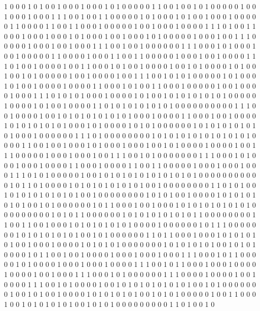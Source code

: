 1 0 0 0 1 0 1 0 0 1 0 0 0 1 0 0 0 1 0 1 0 0 0 0 0 1 1 0 0 1 0 0 1 0
1 0 0 0 0 0 1 0 0 1 0 0 0 1 0 0 0 1 1 1 0 0 1 0 0 1 1 0 0 0 0 0 1 0
1 0 0 0 1 0 1 0 0 1 0 0 0 1 0 0 0 0 0 1 1 0 0 0 0 1 1 0 0 1 1 0 0 0
1 0 0 0 0 0 1 0 0 1 0 0 0 1 0 0 0 0 1 1 1 0 1 0 0 1 1 0 0 0 1 0 0 0
1 0 0 0 1 0 1 0 0 0 1 0 0 1 0 0 0 1 0 1 0 0 0 0 0 1 0 0 0 1 0 0 1 1
1 0 0 0 0 0 1 0 0 0 1 0 0 1 0 0 0 1 1 1 0 0 1 0 0 1 0 0 0 0 0 0 1 1
1 0 0 0 1 0 1 0 0 0 1 0 0 1 0 0 0 0 0 1 1 0 0 0 0 1 0 0 0 1 1 0 0 1
1 0 0 0 0 0 1 0 0 0 1 0 0 1 0 0 0 0 1 1 1 0 1 0 0 1 0 0 0 0 1 0 0 1
1 0 0 0 1 0 1 0 0 1 0 0 0 0 1 0 0 1 0 1 0 0 0 0 1 0 1 0 0 1 0 0 1 0
1 0 0 0 0 0 1 0 0 1 0 0 0 0 1 0 0 1 1 1 0 0 1 0 1 0 1 0 0 0 0 0 1 0
1 0 0 0 1 0 1 0 0 1 0 0 0 0 1 0 0 0 0 1 1 0 0 0 1 0 1 0 0 1 1 0 0 0
1 0 0 0 0 0 1 0 0 1 0 0 0 0 1 0 0 0 1 1 1 0 1 0 1 0 1 0 0 0 1 0 0 0
0 1 0 1 0 0 1 0 1 0 1 0 1 0 1 0 1 0 0 0 0 0 1 0 0 0 0 1 0 1 0 0 1 0
0 0 0 1 1 0 1 0 1 0 1 0 1 0 1 0 1 0 0 0 0 0 0 0 0 0 0 1 1 1 0 0 1 0
0 0 0 1 0 0 1 0 1 0 1 0 1 0 1 0 1 0 1 0 0 0 1 0 0 0 0 1 1 0 0 0 1 0
0 1 0 0 0 0 1 0 1 0 1 0 1 0 1 0 1 0 0 0 1 0 1 0 0 0 0 1 0 1 0 1 0 0
0 0 0 0 1 0 1 0 1 0 1 0 1 0 1 0 1 0 0 0 1 0 0 0 0 0 0 1 1 1 0 1 0 0
0 0 0 0 0 0 1 0 1 0 1 0 1 0 1 0 1 0 1 0 1 0 1 0 0 0 0 1 1 0 0 1 0 0
1 0 0 0 1 0 1 0 0 0 1 0 0 0 1 0 0 1 0 1 0 0 0 0 1 0 0 0 0 1 0 0 1 1
1 0 0 0 0 0 1 0 0 0 1 0 0 0 1 0 0 1 1 1 0 0 1 0 1 0 0 0 0 0 0 0 1 1
1 0 0 0 1 0 1 0 0 0 1 0 0 0 1 0 0 0 0 1 1 0 0 0 1 0 0 0 0 1 1 0 0 1
1 0 0 0 0 0 1 0 0 0 1 0 0 0 1 0 0 0 1 1 1 0 1 0 1 0 0 0 0 0 1 0 0 1
0 1 0 1 0 1 0 1 0 1 0 1 0 1 0 1 0 0 0 0 0 0 0 0 0 0 0 1 0 1 1 0 1 0
0 0 0 1 0 1 0 1 0 1 0 1 0 1 0 1 0 0 1 0 0 0 0 0 0 0 0 1 1 0 1 0 1 0
0 1 0 1 0 1 0 1 0 1 0 1 0 1 0 0 1 0 0 0 0 0 0 0 0 1 0 1 0 1 0 0 1 0
0 0 0 1 0 1 0 1 0 1 0 1 0 1 0 0 1 0 1 0 0 0 0 0 0 1 0 1 1 0 0 0 1 0
0 1 0 0 0 1 0 1 0 1 0 1 0 1 0 1 0 1 0 0 0 0 0 0 0 0 0 1 0 1 0 1 1 0
0 0 0 0 0 1 0 1 0 1 0 1 0 1 0 1 0 1 1 0 0 0 0 0 0 0 0 1 1 0 0 1 1 0
0 1 0 0 0 1 0 1 0 1 0 1 0 1 0 1 0 0 0 0 1 0 0 0 0 0 0 1 0 1 1 1 0 0
0 0 0 0 0 1 0 1 0 1 0 1 0 1 0 1 0 0 1 0 1 0 0 0 0 0 0 1 1 0 1 1 0 0
0 1 0 0 0 1 0 1 0 1 0 1 0 1 0 0 1 0 0 0 1 0 0 0 0 1 0 1 0 1 0 1 0 0
0 0 0 0 0 1 0 1 0 1 0 1 0 1 0 0 1 0 1 0 1 0 0 0 0 1 0 1 1 0 0 1 0 0
1 0 0 0 0 1 0 0 0 1 0 0 0 1 0 0 0 1 1 1 0 0 0 1 0 1 1 0 0 0 0 0 1 0
1 0 0 0 0 1 0 0 0 1 0 0 0 1 0 0 0 0 1 1 1 0 0 1 0 1 1 0 0 0 1 0 0 0
1 0 0 0 0 1 0 0 0 0 1 0 0 1 0 0 0 1 1 1 0 0 0 1 0 1 0 0 0 0 0 0 1 1
1 0 0 0 0 1 0 0 0 0 1 0 0 1 0 0 0 0 1 1 1 0 0 1 0 1 0 0 0 0 1 0 0 1
0 1 0 1 0 1 0 1 0 1 0 1 0 0 1 0 1 0 0 0 0 0 0 0 1 0 0 1 0 1 0 0 1 0
0 0 0 1 0 1 0 1 0 1 0 1 0 0 1 0 1 0 1 0 0 0 0 0 1 0 0 1 1 0 0 0 1 0
0 1 0 1 0 1 0 1 0 1 0 0 1 0 1 0 1 0 0 0 0 0 0 0 0 0 1 1 0 1 0 0 1 0
